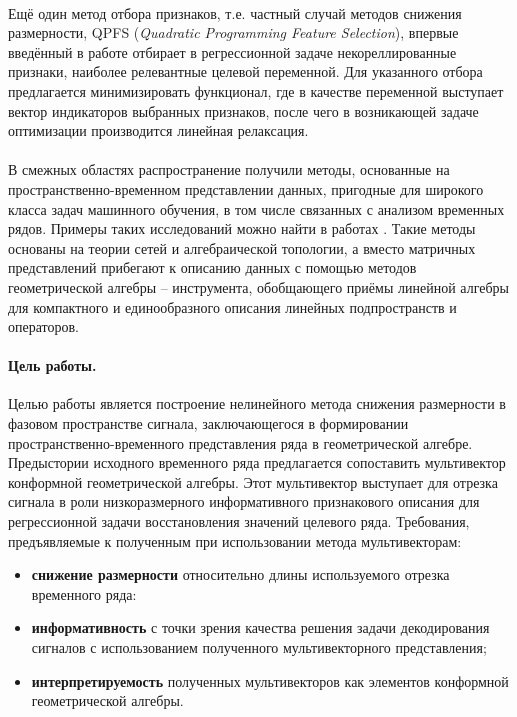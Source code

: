 \documentclass[12pt]{article}
\begin{document}
\paragraph{}

Ещё один метод отбора признаков, т.е. частный случай методов снижения размерности, QPFS (\textit{Quadratic Programming Feature Selection}), впервые введённый в работе \cite{RodrguezLujn2010QuadraticPF} отбирает в регрессионной задаче некореллированные признаки, наиболее релевантные целевой переменной. Для указанного отбора предлагается минимизировать функционал, где в качестве переменной выступает вектор индикаторов выбранных признаков, после чего в возникающей задаче оптимизации производится линейная релаксация.


\paragraph{}
В смежных областях распространение получили методы, основанные на  пространственно-временном представлении данных, пригодные для широкого класса задач машинного обучения, в том числе связанных с анализом временных рядов. Примеры таких исследований можно найти в работах \cite{Thiruvengadam2020, Yuan2010, Hu201, Lasenby1998}. Такие методы основаны на теории сетей и алгебраической топологии, а вместо матричных представлений прибегают к описанию данных с помощью методов геометрической алгебры -- инструмента, обобщающего приёмы линейной алгебры для компактного и единообразного описания линейных подпространств и операторов.


\paragraph{Цель работы.} 

Целью работы является построение нелинейного метода снижения размерности в фазовом пространстве сигнала, заключающегося в формировании пространственно-временного представления ряда в геометрической алгебре. Предыстории исходного временного ряда предлагается сопоставить мультивектор конформной геометрической алгебры. Этот мультивектор выступает для отрезка сигнала в роли низкоразмерного информативного признакового описания для регрессионной задачи восстановления значений целевого ряда. Требования, предъявляемые к полученным при использовании метода мультивекторам:
\begin{itemize}
    \item[] \textbf{снижение размерности} относительно длины используемого отрезка временного ряда:
    \item[] \textbf{информативность} с точки зрения качества решения задачи декодирования сигналов с использованием полученного мультивекторного представления;
    \item[] \textbf{интерпретируемость} полученных мультивекторов как элементов конформной геометрической алгебры.
\end{itemize}
\end{document}
